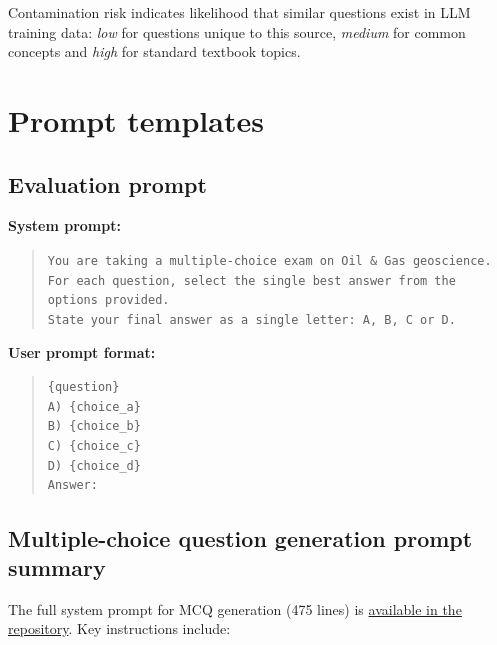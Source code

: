 \documentclass[11pt]{article}
\begin{document}
Contamination risk indicates likelihood that similar questions exist in LLM training data: \textit{low} for questions unique to this source, \textit{medium} for common concepts and \textit{high} for standard textbook topics.

\section{Prompt templates}

\subsection{Evaluation prompt}

\textbf{System prompt:}
\begin{quote}
\small\texttt{You are taking a multiple-choice exam on Oil \& Gas geoscience.}\\
\small\texttt{For each question, select the single best answer from the options provided.}\\
\small\texttt{State your final answer as a single letter: A, B, C or D.}
\end{quote}

\textbf{User prompt format:}
\begin{quote}
\texttt{\{question\}}\\[0.5em]
\texttt{A) \{choice\_a\}}\\
\texttt{B) \{choice\_b\}}\\
\texttt{C) \{choice\_c\}}\\
\texttt{D) \{choice\_d\}}\\[0.5em]
\texttt{Answer:}
\end{quote}

\subsection{Multiple-choice question generation prompt summary}

The full system prompt for MCQ generation (475 lines) is \href{https://github.com/AlmazErmilov/FormationEval-an-Open-Benchmark-for-Oil-Gas-Geoscience-MCQ-Evaluation/blob/v0.1/src/prompts/mcq_generator_system_prompt.txt}{available in the repository}.
Key instructions include:
\end{document}
